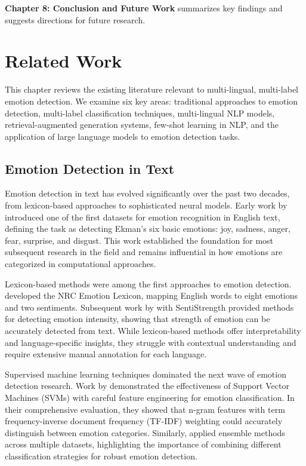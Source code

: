 \documentclass[a4paper,12pt]{extarticle}
\begin{document}
\textbf{Chapter 8: Conclusion and Future Work} summarizes key findings and suggests directions for future research.

\section{Related Work}

This chapter reviews the existing literature relevant to multi-lingual, multi-label emotion detection. We examine six key areas: traditional approaches to emotion detection, multi-label classification techniques, multi-lingual NLP models, retrieval-augmented generation systems, few-shot learning in NLP, and the application of large language models to emotion detection tasks.

\subsection{Emotion Detection in Text}

Emotion detection in text has evolved significantly over the past two decades, from lexicon-based approaches to sophisticated neural models. Early work by \cite{strapparava2007semeval} introduced one of the first datasets for emotion recognition in English text, defining the task as detecting Ekman's six basic emotions: joy, sadness, anger, fear, surprise, and disgust. This work established the foundation for most subsequent research in the field and remains influential in how emotions are categorized in computational approaches.

Lexicon-based methods were among the first approaches to emotion detection. \cite{mohammad2013crowdsourcing} developed the NRC Emotion Lexicon, mapping English words to eight emotions and two sentiments. Subsequent work by \cite{thelwall2010sentiment} with SentiStrength provided methods for detecting emotion intensity, showing that strength of emotion can be accurately detected from text. While lexicon-based methods offer interpretability and language-specific insights, they struggle with contextual understanding and require extensive manual annotation for each language.

Supervised machine learning techniques dominated the next wave of emotion detection research. Work by \cite{balahur2013sentiment} demonstrated the effectiveness of Support Vector Machines (SVMs) with careful feature engineering for emotion classification. In their comprehensive evaluation, they showed that n-gram features with term frequency-inverse document frequency (TF-IDF) weighting could accurately distinguish between emotion categories. Similarly, \cite{colneric2018emotion} applied ensemble methods across multiple datasets, highlighting the importance of combining different classification strategies for robust emotion detection.
\end{document}
